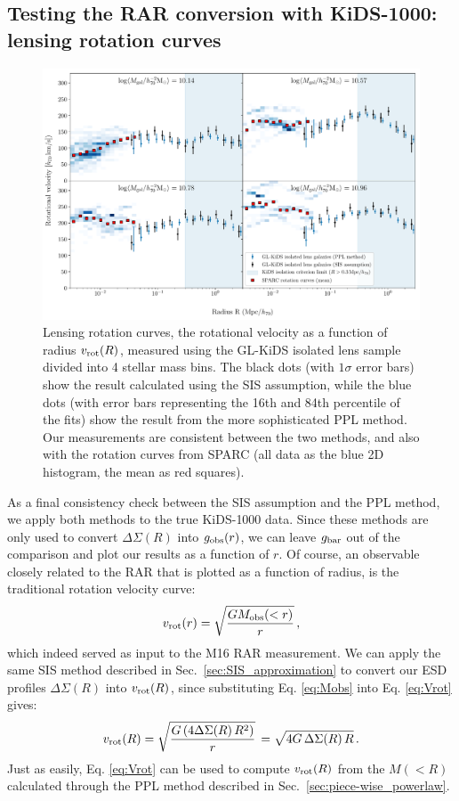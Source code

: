 \documentclass[usenatbib]{mnras}
\newcommand{\un}[1]{_{\rm #1}}
\begin{document}
\subsection{Testing the RAR conversion with KiDS-1000: lensing rotation curves}
\label{sec:results-rotation}

\begin{figure}
	\includegraphics[width=\textwidth]{Figures/ESD_KiDS_massbins-8p5_10p3_10p6_10p8_11p0_iso.pdf}
	\caption{Lensing rotation curves, the rotational velocity as a function of radius $v\un{rot}(R)$, measured using the GL-KiDS isolated lens sample divided into 4 stellar mass bins. The black dots (with $1\sigma$ error bars) show the result calculated using the SIS assumption, while the blue dots (with error bars representing the 16th and 84th percentile of the fits) show the result from the more sophisticated PPL method. Our measurements are consistent between the two methods, and also with the rotation curves from SPARC (all data as the blue 2D histogram, the mean as red squares).}
	\label{fig:Vrot_kids_verlinde_mice}
\end{figure}

As a final consistency check between the SIS assumption and the PPL method, we apply both methods to the true KiDS-1000 data. Since these methods are only used to convert $\Delta\Sigma(R)$ into $g\un{obs}(r)$, we can leave $g\un{bar}$ out of the comparison and plot our results as a function of $r$. Of course, an observable closely related to the RAR that is plotted as a function of radius, is the traditional rotation velocity curve:
\begin{equation}\label{eq:Vrot}
v\un{rot}(r) = \sqrt{\frac{G M\un{obs}(<r)}{r}} \, ,
\end{equation}
which indeed served as input to the M16 RAR measurement. We can apply the same SIS method described in Sec.~\ref{sec:SIS_approximation} to convert our ESD profiles $\Delta\Sigma(R)$ into $v\un{rot}(R)$, since substituting Eq. \ref{eq:Mobs} into Eq. \ref{eq:Vrot} gives:
\begin{equation}
v\un{rot}(R) = \sqrt{\frac{G \, (4 \Delta\Sigma(R) \, R^2)}{r}} \, = \sqrt{4 G \, \Delta\Sigma(R) \, R} \, .
\end{equation}
Just as easily, Eq. \ref{eq:Vrot} can be used to compute $v\un{rot}(R)$ from the $M(<R)$ calculated through the PPL method described in Sec.~\ref{sec:piece-wise_powerlaw}.
\end{document}
